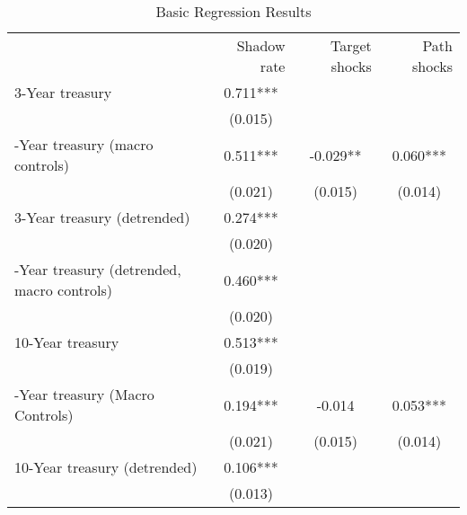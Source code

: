 \begin{table}[!h]
\caption{Basic Regression Results}
\centering
\begin{tabular}{llll}
\cline{1-4}
\multicolumn{1}{c}{} &
  \multicolumn{1}{|r}{Shadow rate} &
  \multicolumn{1}{r}{Target shocks} &
  \multicolumn{1}{r}{Path shocks} \\
\cline{1-4}
\multicolumn{1}{l}{3-Year treasury} &
  \multicolumn{1}{|c}{0.711***} &
  \multicolumn{1}{c}{} &
  \multicolumn{1}{c}{} \\
\multicolumn{1}{l}{} &
  \multicolumn{1}{|c}{(0.015)} &
  \multicolumn{1}{c}{} &
  \multicolumn{1}{c}{} \\
\multicolumn{1}{l}{\quad 3-Year treasury (macro controls)} &
  \multicolumn{1}{|c}{0.511***} &
  \multicolumn{1}{c}{-0.029**} &
  \multicolumn{1}{c}{0.060***} \\
\multicolumn{1}{l}{} &
  \multicolumn{1}{|c}{(0.021)} &
  \multicolumn{1}{c}{(0.015)} &
  \multicolumn{1}{c}{(0.014)} \\
\multicolumn{1}{l}{3-Year treasury (detrended)} &
  \multicolumn{1}{|c}{0.274***} &
  \multicolumn{1}{c}{} &
  \multicolumn{1}{c}{} \\
\multicolumn{1}{l}{} &
  \multicolumn{1}{|c}{(0.020)} &
  \multicolumn{1}{c}{} &
  \multicolumn{1}{c}{} \\
\multicolumn{1}{l}{\quad 3-Year treasury (detrended, macro controls)} &
  \multicolumn{1}{|c}{0.460***} &
  \multicolumn{1}{c}{} &
  \multicolumn{1}{c}{} \\
\multicolumn{1}{l}{} &
  \multicolumn{1}{|c}{(0.020)} &
  \multicolumn{1}{c}{} &
  \multicolumn{1}{c}{} \\
\multicolumn{1}{l}{10-Year treasury} &
  \multicolumn{1}{|c}{0.513***} &
  \multicolumn{1}{c}{} &
  \multicolumn{1}{c}{} \\
\multicolumn{1}{l}{} &
  \multicolumn{1}{|c}{(0.019)} &
  \multicolumn{1}{c}{} &
  \multicolumn{1}{c}{} \\
\multicolumn{1}{l}{\quad 10-Year treasury (Macro Controls)} &
  \multicolumn{1}{|c}{0.194***} &
  \multicolumn{1}{c}{-0.014} &
  \multicolumn{1}{c}{0.053***} \\
\multicolumn{1}{l}{} &
  \multicolumn{1}{|c}{(0.021)} &
  \multicolumn{1}{c}{(0.015)} &
  \multicolumn{1}{c}{(0.014)} \\
\multicolumn{1}{l}{10-Year treasury (detrended)} &
  \multicolumn{1}{|c}{0.106***} &
  \multicolumn{1}{c}{} &
  \multicolumn{1}{c}{} \\
\multicolumn{1}{l}{} &
  \multicolumn{1}{|c}{(0.013)} &

\end{tabular}
\end{table}
